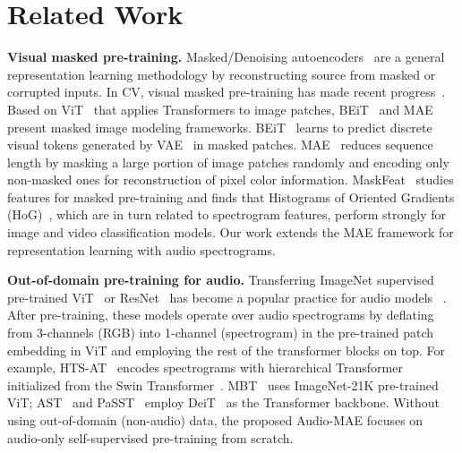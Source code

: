 \documentclass{article}
\renewcommand{\paragraph}[1]{\vspace{1.25mm}\noindent\textbf{#1}}
\begin{document}
\section{Related Work}


\paragraph{Visual masked pre-training.}
Masked/Denoising autoencoders~\cite{dae,sae,bert} are 
a general representation learning methodology by 
reconstructing source from masked or corrupted inputs.
In CV, visual masked pre-training has made recent progress~\cite{PathakKDDE16,chen2020,mae,maskedfeat}.
Based on ViT~\cite{dosovitskiy2020image} that applies Transformers to image patches, BEiT~\cite{beit} and MAE~\cite{mae} present masked image modeling frameworks.  BEiT~\cite{beit} learns to predict discrete visual tokens generated by VAE~\cite{dalle} in masked patches. 
MAE~\cite{mae} reduces  sequence length by masking a large portion of image patches randomly and encoding only non-masked ones for reconstruction of pixel color information.
MaskFeat~\cite{maskedfeat} studies features for masked pre-training and finds that Histograms of Oriented Gradients (HoG)~\cite{Dalal2005}, which are in turn related to spectrogram features, perform strongly for image and video classification models.
Our work extends the MAE framework for representation learning with audio spectrograms. 



\paragraph{Out-of-domain pre-training for audio.}
Transferring ImageNet supervised pre-trained ViT~\cite{dosovitskiy2020image} or ResNet~\cite{He2015DeepRL} has become a popular practice for audio models ~\cite{gong2021ast,paast,Nagrani21c,chen2022hts,gong2021psla,cmkd}. 
After pre-training, these models operate over audio spectrograms by deflating from 3-channels (RGB) into 1-channel (spectrogram) in the pre-trained patch embedding in ViT and employing the rest of the transformer blocks on top. 
For example, 
HTS-AT~\cite{chen2022hts} encodes spectrograms with hierarchical Transformer initialized from the Swin Transformer~\cite{swin}.
MBT~\cite{Nagrani21c} uses ImageNet-21K pre-trained ViT; AST~\cite{gong2021ast} and PaSST~\cite{paast} employ DeiT~\cite{touvron2021training} as the Transformer backbone.
Without using out-of-domain (non-audio) data, the proposed Audio-MAE focuses on audio-only self-supervised pre-training from scratch.
\end{document}

